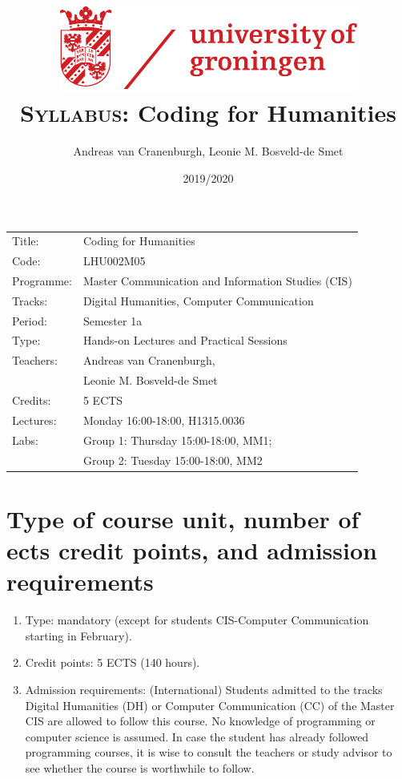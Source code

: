 \documentclass[a4paper,12pt]{article}
\title{
    \includegraphics{rug}\\
    \textsc{Syllabus:} Coding for Humanities}
\author{Andreas van Cranenburgh, Leonie M. Bosveld-de Smet}
\date{2019/2020}
\begin{document}
\maketitle
\thispagestyle{empty}
\pagestyle{empty}


\begin{tabular}{l p{} }
    Title:      & Coding for Humanities \\
    Code:       & LHU002M05 \\
    Programme:  & Master Communication and Information Studies (CIS) \\
    Tracks:     & Digital Humanities, Computer Communication \\
    Period:     & Semester 1a \\
    Type:       & Hands-on Lectures and Practical Sessions \\
    Teachers:   & Andreas van Cranenburgh, \\
                & Leonie M. Bosveld-de Smet \\
    Credits:    & 5 ECTS \\
    Lectures:   & Monday 16:00-18:00, H1315.0036 \\
    Labs:       & Group 1: Thursday 15:00-18:00, MM1; \\
                & Group 2: Tuesday 15:00-18:00, MM2 \\
\end{tabular}



\section{Type of course unit, number of ects credit points,
        and admission requirements}
\begin{enumerate}[label={(\alph*)}]
    \item Type: mandatory (except for students CIS-Computer Communication
        starting in February).
    \item Credit points: 5 ECTS (140 hours).
    \item Admission requirements: (International) Students admitted to the
        tracks Digital Humanities (DH) or Computer Communication (CC) of the
        Master CIS are allowed to follow this course. No knowledge of
        programming or computer science is assumed. In case the student has
        already followed programming courses, it is wise to consult the
        teachers or study advisor to see whether the course is worthwhile to
        follow.
\end{enumerate}
\end{document}
